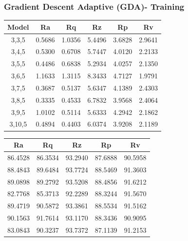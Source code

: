 \documentclass[suppldata]{interact}
\begin{document}
   \newpage 
\begin {landscape}
\subsubsection{ Gradient Descent Adaptive (GDA)- Training}
  \begin{minipage}{0.35\textwidth}
  \small
 \centering
    \begin{tabular}{|c|c|c|c|c|c|}
    \hline
        Model & Ra &  Rq &  Rz &  Rp & Rv \\ \hline
        3,3,5 & 0.5686 & 1.0356 & 5.4496 & 3.6828 & 2.9641 \\ \hline
        3,4,5 & 0.5300 & 0.6708 & 5.7447 & 4.0120 & 2.2133 \\ \hline
        3,5,5 & 0.4486 & 0.6838 & 5.2934 & 4.0257 & 2.1350 \\ \hline
        3,6,5 & 1.1633 & 1.3115 & 8.3433 & 4.7127 & 1.9791 \\ \hline
        3,7,5 & 0.3687 & 0.5137 & 5.6347 & 4.1389 & 2.4303 \\ \hline
        3,8,5 & 0.3335 & 0.4533 & 6.7832 & 3.9568 & 2.4064 \\ \hline
        3,9,5 & 1.0102 & 0.5114 & 5.6333 & 4.2942 & 2.1862 \\ \hline
        3,10,5 & 0.4894 & 0.4403 & 6.0374 & 3.9208 & 2.1189 \\ \hline
    \end{tabular}
        \label{tab:gdamsetr}
    \end{minipage}
   \hfill
   \begin{minipage}{0.30\textwidth}
   \small
\centering
    \centering
      \begin{tabular}{|c|c|c|c|c|}
    \hline
         Ra &  Rq &  Rz &  Rp & Rv \\ \hline
        86.4528 & 86.3534 & 93.2940 & 87.6888 & 90.5958 \\ \hline
        88.4843 & 89.6484 & 93.7724 & 88.5469 & 91.3603 \\ \hline
        89.0898 & 89.2792 & 93.5208 & 88.4856 & 91.6212 \\ \hline
        82.7768 & 85.3713 & 92.2289 & 88.3244 & 91.5670 \\ \hline
        89.4719 & 90.5872 & 93.3861 & 88.5534 & 91.5162 \\ \hline
        90.1563 & 91.7614 & 93.1170 & 88.3436 & 90.9095 \\ \hline
        83.0843 & 90.3237 & 93.7372 & 87.1139 & 91.2153 \\ \hline

\end{tabular}
\end{minipage}
\end{landscape}
\end{document}
